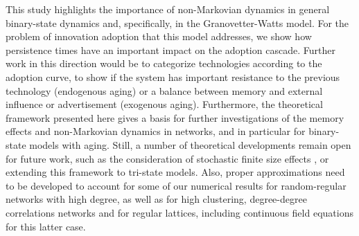 
This study highlights the importance of non-Markovian dynamics in general  binary-state dynamics and, specifically, in the Granovetter-Watts model. For the problem of innovation adoption that this model addresses, we show how persistence times have an important impact on the adoption cascade. Further work in this direction would be to categorize technologies according to the adoption curve, to show if the system has important resistance to the previous technology (endogenous aging) or a balance between memory and external influence or advertisement (exogenous aging). Furthermore, the theoretical framework presented here gives a basis for further investigations of the memory effects and non-Markovian dynamics in networks, and in particular for  binary-state models with aging. Still, a number of theoretical developments remain open for future work, such as the consideration of stochastic finite size effects \cite{peralta-2020B}, or extending this framework to tri-state models. Also, proper approximations need to be developed to account for some of our numerical results for random-regular networks with high degree, as well as for high clustering, degree-degree correlations networks and for regular lattices, including continuous field equations for this latter case. 
